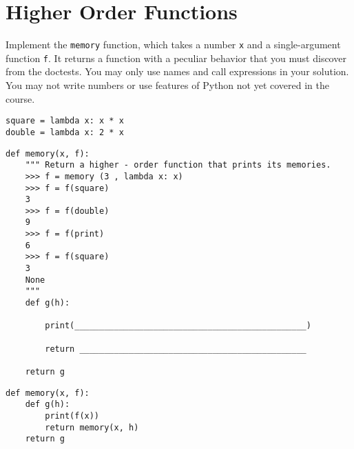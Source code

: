 \documentclass{exam}
\begin{document}
\clearpage

\section{Higher Order Functions}
\begin{questions}
\question Implement the \lstinline$memory$ function, which takes a number \lstinline$x$ and a single-argument function \lstinline$f$. It returns a function with a peculiar behavior that you must discover from the doctests. You may only use names and call expressions in your solution. You may not write numbers or use features of Python not yet covered in the course.

\begin{lstlisting}
square = lambda x: x * x
double = lambda x: 2 * x
\end{lstlisting}

\ifprintanswers\else
\begin{lstlisting}
def memory(x, f):
    """ Return a higher - order function that prints its memories.
    >>> f = memory (3 , lambda x: x)
    >>> f = f(square)
    3
    >>> f = f(double)
    9
    >>> f = f(print)
    6
    >>> f = f(square)
    3
    None
    """
    def g(h):

        print(_______________________________________________)

        return ______________________________________________

    return g
\end{lstlisting}
\fi

\begin{solution}
\begin{lstlisting}
def memory(x, f):
    def g(h):
        print(f(x))
        return memory(x, h)
    return g
\end{lstlisting}
\end{solution}
\end{questions}

\clearpage
\end{document}

